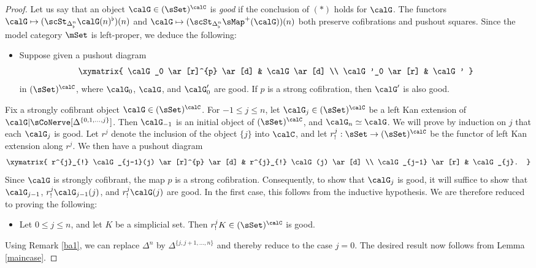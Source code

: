 \begin{proof}
Let us say that an object $\calG \in (\sSet)^{\calC}$ is {\em good} if the conclusion of $(\ast)$ holds for
$\calG$. The functors $\calG \mapsto (\scSt_{\Delta^{n}_{\flat}} \calG(n)^{\flat})(n)$ and
$\calG \mapsto (\scSt_{\Delta^{n}_{\flat}} \sMap^{+}(\calG))(n)$ both preserve cofibrations and pushout squares. Since the model category $\mSet$ is left-proper, we deduce the following:

\begin{itemize}
\item[$(a)$] Suppose given a pushout diagram
$$ \xymatrix{ \calG_0 \ar[r]^{p} \ar[d] & \calG \ar[d] \\
\calG'_0 \ar[r] & \calG' }$$
in $(\sSet)^{\calC}$, where $\calG_0$, $\calG$, and $\calG'_0$ are good. 
If $p$ is a strong cofibration, then $\calG'$ is also good.
\end{itemize}

Fix a strongly cofibrant object $\calG \in (\sSet)^{\calC}$. For $-1 \leq j \leq n$, let $\calG_{j} \in (\sSet)^{\calC}$ be a left Kan extension of $\calG | \sCoNerve[ \Delta^{ \{0, 1, \ldots, j \} }]$. Then
$\calG_{-1}$ is an initial object of $(\sSet)^{\calC}$, and $\calG_{n} \simeq \calG$. We will prove
by induction on $j$ that each $\calG_{j}$ is good. Let $r^{j}$ denote the inclusion of the object $\{j\}$ into $\calC$, and let $r^{j}_{!}: \sSet \rightarrow (\sSet)^{\calC}$ be the functor of left Kan extension along $r^{j}$. We then have a pushout diagram
$$ \xymatrix{ r^{j}_{!} \calG_{j-1}(j) \ar[r]^{p} \ar[d] & r^{j}_{!} \calG(j) \ar[d] \\
\calG_{j-1} \ar[r] & \calG_{j}. }$$
Since $\calG$ is strongly cofibrant, the map $p$ is a strong cofibration.
Consequently, to show that $\calG_{j}$ is good, it will suffice to show that
$\calG_{j-1}$, $r^{j}_{!} \calG_{j-1}(j)$, and $r^{j}_{!} \calG(j)$ are good. In the first case, this follows from the inductive hypothesis. We are therefore reduced to proving the following:

\begin{itemize}
\item[$(\ast')$] Let $0 \leq j \leq n$, and let $K$ be a simplicial set. Then
$r^{j}_{!} K \in (\sSet)^{\calC}$ is good.
\end{itemize}

Using Remark \ref{ba1}, we can replace $\Delta^{n}$ by $\Delta^{ \{j, j+1, \ldots, n \} }$ and
thereby reduce to the case $j=0$. The desired result now follows from Lemma \ref{maincase}.
\end{proof}

